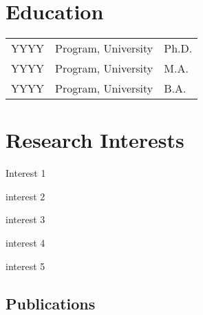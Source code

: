 \documentclass[11pt]{article}
\newcommand{\RR}{\raggedright\arraybackslash} %
\newcommand{\RL}{\raggedleft\arraybackslash}  %
\begin{document}
\section*{Education}
\begin{tabularx}{\linewidth}{>{\RR}p{1in}>{\RR}X>{\RL}p{1in}}
  YYYY&Program, University&Ph.D. \\ %
  YYYY&Program, University&M.A. \\
  YYYY&Program, University&B.A. \\
\end{tabularx}



\section*{Research Interests}

\hspace{-.25em}\begin{itemize*}[itemjoin={{; }}, label={}]
\item Interest 1
\item interest 2
\item interest 3
\item interest 4
\item interest 5
\end{itemize*}



\begin{refsection}
\section*{Publications}
\nocite{*}                          %
\printbibliography[heading = none,  %
keyword = article,                  %
env = mybib]                        %
\end{refsection}
\end{document}
